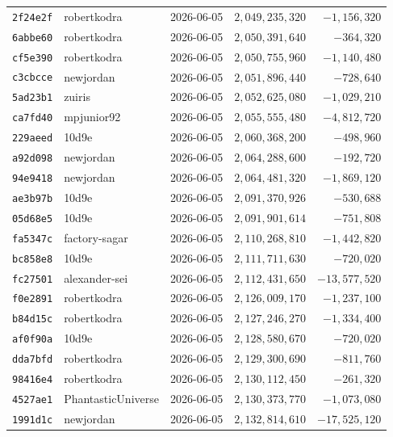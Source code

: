 {\begin{longtable}{@{}lllrr@{}}
\texttt{2f24e2f} & robertkodra & 2026-06-05 & $2{,}049{,}235{,}320$ & $-1{,}156{,}320$\\
\texttt{6abbe60} & robertkodra & 2026-06-05 & $2{,}050{,}391{,}640$ & $-364{,}320$\\
\texttt{cf5e390} & robertkodra & 2026-06-05 & $2{,}050{,}755{,}960$ & $-1{,}140{,}480$\\
\texttt{c3cbcce} & newjordan & 2026-06-05 & $2{,}051{,}896{,}440$ & $-728{,}640$\\
\texttt{5ad23b1} & zuiris & 2026-06-05 & $2{,}052{,}625{,}080$ & $-1{,}029{,}210$\\
\texttt{ca7fd40} & mpjunior92 & 2026-06-05 & $2{,}055{,}555{,}480$ & $-4{,}812{,}720$\\
\texttt{229aeed} & 10d9e & 2026-06-05 & $2{,}060{,}368{,}200$ & $-498{,}960$\\
\texttt{a92d098} & newjordan & 2026-06-05 & $2{,}064{,}288{,}600$ & $-192{,}720$\\
\texttt{94e9418} & newjordan & 2026-06-05 & $2{,}064{,}481{,}320$ & $-1{,}869{,}120$\\
\texttt{ae3b97b} & 10d9e & 2026-06-05 & $2{,}091{,}370{,}926$ & $-530{,}688$\\
\texttt{05d68e5} & 10d9e & 2026-06-05 & $2{,}091{,}901{,}614$ & $-751{,}808$\\
\texttt{fa5347c} & factory-sagar & 2026-06-05 & $2{,}110{,}268{,}810$ & $-1{,}442{,}820$\\
\texttt{bc858e8} & 10d9e & 2026-06-05 & $2{,}111{,}711{,}630$ & $-720{,}020$\\
\texttt{fc27501} & alexander-sei & 2026-06-05 & $2{,}112{,}431{,}650$ & $-13{,}577{,}520$\\
\texttt{f0e2891} & robertkodra & 2026-06-05 & $2{,}126{,}009{,}170$ & $-1{,}237{,}100$\\
\texttt{b84d15c} & robertkodra & 2026-06-05 & $2{,}127{,}246{,}270$ & $-1{,}334{,}400$\\
\texttt{af0f90a} & 10d9e & 2026-06-05 & $2{,}128{,}580{,}670$ & $-720{,}020$\\
\texttt{dda7bfd} & robertkodra & 2026-06-05 & $2{,}129{,}300{,}690$ & $-811{,}760$\\
\texttt{98416e4} & robertkodra & 2026-06-05 & $2{,}130{,}112{,}450$ & $-261{,}320$\\
\texttt{4527ae1} & PhantasticUniverse & 2026-06-05 & $2{,}130{,}373{,}770$ & $-1{,}073{,}080$\\
\texttt{1991d1c} & newjordan & 2026-06-05 & $2{,}132{,}814{,}610$ & $-17{,}525{,}120$\\

\end{longtable}}

